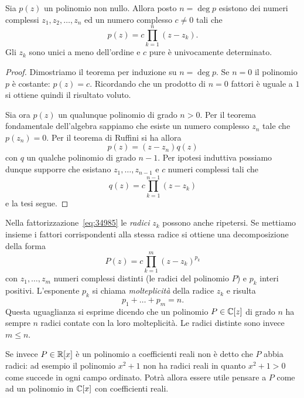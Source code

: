 \begin{theorem}
%
%
%
Sia $p(z)$ un polinomio non nullo. Allora posto $n=\deg p$ esistono dei numeri complessi $z_1, z_2, \dots, z_n$ ed un numero complesso $c\neq 0$ tali che
\begin{equation}\label{eq:34985}
  p(z) = c \prod_{k=1}^n (z-z_k).
\end{equation}
Gli $z_k$ sono unici a meno dell'ordine e $c$ pure è univocamente determinato.
\end{theorem}
%
\begin{proof}
Dimostriamo il teorema per induzione su $n=\deg p$. Se $n=0$ il polinomio $p$ è costante: $p(z) = c$. Ricordando che un prodotto di $n=0$ fattori è uguale a $1$ si ottiene quindi il risultato voluto.

Sia ora $p(z)$ un qualunque polinomio di grado $n>0$. Per il teorema fondamentale dell'algebra sappiamo che esiste un numero complesso $z_n$ tale che $p(z_n)=0$. Per il teorema di Ruffini si ha allora
\[
  p(z) = (z-z_n) q(z)
\]
con $q$ un qualche polinomio di grado $n-1$. Per ipotesi induttiva possiamo dunque supporre che esistano $z_1, \dots, z_{n-1}$ e $c$ numeri complessi tali che
\[
   q(z) = c \prod_{k=1}^{n-1} (z-z_k)
\]
e la tesi segue.
\end{proof}

Nella fattorizzazione~\eqref{eq:34985} le \emph{radici} $z_k$ possono
anche ripetersi. Se mettiamo insieme i fattori corrispondenti alla stessa radice
si ottiene una decomposizione della forma
\begin{equation}\label{eq:358925}
P(z) = c \prod_{k=1}^m (z-z_k)^{p_k}
\end{equation}
con $z_1, \dots, z_m$ numeri complessi distinti (le radici del polinomio $P$)
e $p_k$ interi positivi.
L'esponente $p_k$ si chiama
\emph{molteplicità}%
%
 della radice $z_k$ e risulta
\[
  p_1 + \dots + p_m = n.
\]
Questa uguaglianza si esprime dicendo che un polinomio $P\in {\mathbb C}[z]$
di grado $n$ ha sempre $n$ radici contate con la loro molteplicità.
Le radici distinte sono invece $m\le n$.

Se invece $P\in {\mathbb R}[x]$ è un polinomio a coefficienti reali
non è detto che $P$ abbia radici: ad esempio il
polinomio $x^2+1$ non ha radici reali in quanto $x^2+1>0$
come succede in ogni campo ordinato.
Potrà allora essere utile pensare a $P$ come ad un polinomio
in ${\mathbb C}[x]$ con coefficienti reali.

